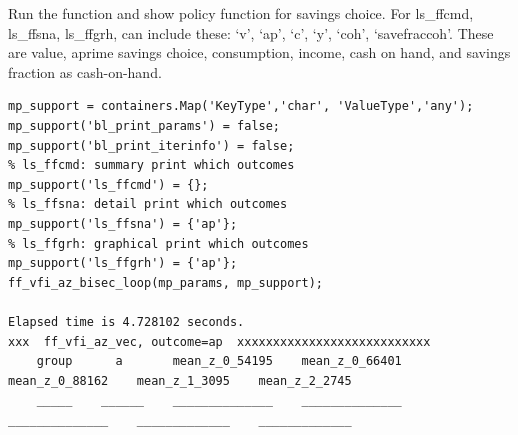 \documentclass[
]{book}
\begin{document}
Run the function and show policy function for savings choice. For
ls\_ffcmd, ls\_ffsna, ls\_ffgrh, can include these: `v', `ap', `c', `y',
`coh', `savefraccoh'. These are value, aprime savings choice,
consumption, income, cash on hand, and savings fraction as cash-on-hand.

\begin{verbatim}
mp_support = containers.Map('KeyType','char', 'ValueType','any');
mp_support('bl_print_params') = false;
mp_support('bl_print_iterinfo') = false;
% ls_ffcmd: summary print which outcomes
mp_support('ls_ffcmd') = {};
% ls_ffsna: detail print which outcomes
mp_support('ls_ffsna') = {'ap'};
% ls_ffgrh: graphical print which outcomes
mp_support('ls_ffgrh') = {'ap'};
ff_vfi_az_bisec_loop(mp_params, mp_support);

Elapsed time is 4.728102 seconds.
xxx  ff_vfi_az_vec, outcome=ap  xxxxxxxxxxxxxxxxxxxxxxxxxxx
    group      a       mean_z_0_54195    mean_z_0_66401    mean_z_0_88162    mean_z_1_3095    mean_z_2_2745
    _____    ______    ______________    ______________    ______________    _____________    _____________


\end{verbatim}
\end{document}
